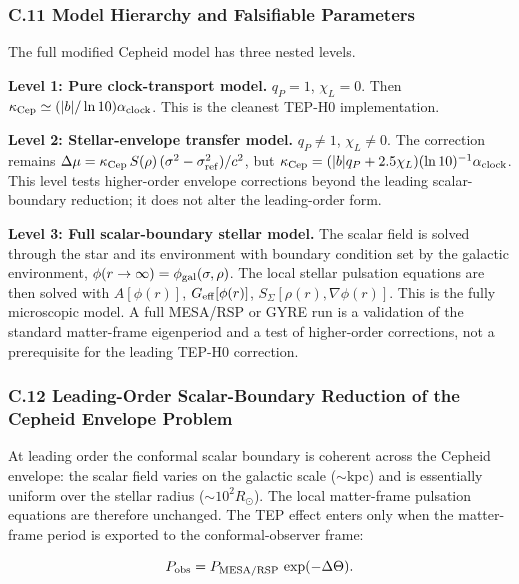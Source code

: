 \documentclass[
]{article}
\begin{document}
\subsubsection{C.11 Model Hierarchy and Falsifiable
Parameters}\label{c.11-model-hierarchy-and-falsifiable-parameters}

The full modified Cepheid model has three nested levels.

\textbf{Level 1: Pure clock-transport model.} \(q_P = 1\),
\(\chi_L = 0\). Then
\(\kappa_{\rm Cep} \simeq (|b|/\ln 10)\alpha_{\rm clock}\). This is the
cleanest TEP-H0 implementation.

\textbf{Level 2: Stellar-envelope transfer model.} \(q_P \neq 1\),
\(\chi_L \neq 0\). The correction remains
\(\Delta\mu = \kappa_{\rm Cep}\,S(\rho)\,(\sigma^2 - \sigma_{\rm ref}^2)/c^2\),
but
\(\kappa_{\rm Cep} = (|b|q_P + 2.5\chi_L)(\ln 10)^{-1}\alpha_{\rm clock}\).
This level tests higher-order envelope corrections beyond the leading
scalar-boundary reduction; it does not alter the leading-order form.

\textbf{Level 3: Full scalar-boundary stellar model.} The scalar field
is solved through the star and its environment with boundary condition
set by the galactic environment,
\(\phi(r \to \infty) = \phi_{\rm gal}(\sigma, \rho)\). The local stellar
pulsation equations are then solved with \(A[\phi(r)]\),
\(G_{\rm eff}[\phi(r)]\), \(S_\Sigma[\rho(r), \nabla\phi(r)]\). This is
the fully microscopic model. A full MESA/RSP or GYRE run is a validation
of the standard matter-frame eigenperiod and a test of higher-order
corrections, not a prerequisite for the leading TEP-H0 correction.

\subsubsection{C.12 Leading-Order Scalar-Boundary Reduction of the
Cepheid Envelope
Problem}\label{c.12-leading-order-scalar-boundary-reduction-of-the-cepheid-envelope-problem}

At leading order the conformal scalar boundary is coherent across the
Cepheid envelope: the scalar field varies on the galactic scale
(\(\sim\)kpc) and is essentially uniform over the stellar radius
(\(\sim 10^{2} R_{\odot}\)). The local matter-frame pulsation equations
are therefore unchanged. The TEP effect enters only when the
matter-frame period is exported to the conformal-observer frame:

\begin{equation}
P_{\rm obs} = P_{\rm MESA/RSP}\,\exp(-\Delta\Theta) .
\end{equation}
\end{document}
